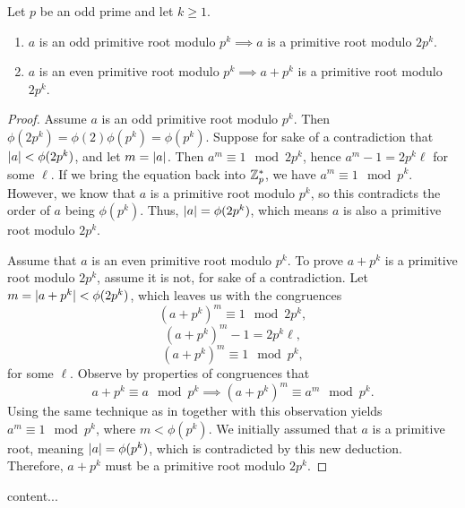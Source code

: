 \documentclass[11pt]{article}
\begin{document}
\begin{exercise}{4}
Let $ p $ be an odd prime and let $ k \geq 1 $.
\begin{enumerate}
	\item $ a $ is an odd primitive root modulo $ p^{k} \implies a $ is a primitive root modulo $ 2p^{k} $.
	\item $ a $ is an even primitive root modulo $ p^{k} \implies a + p^{k}$ is a primitive root modulo $ 2p^{k} $.
\end{enumerate}
\end{exercise}

\begin{proof}
 Assume $ a $ is an odd primitive root modulo $ p^{k} $. Then $ \phi(2p^{k})  = \phi(2) \phi(p^{k}) = \phi(p^{k})$. Suppose for sake of a contradiction that $ |a| < \phi(2 p^{k})$, and let $ m = |a| $. Then $ a^{m} \equiv 1 \mod 2 p^{k} $, hence 
$ a^{m} - 1 = 2 p^{k} \ell $ for some $ \ell $. If we bring the equation back into $ \mathbb{Z}^{*}_{p} $, we have $ a^{m} \equiv 1 \mod p^{k} $. However, we know that $ a $ is a primitive root modulo $ p^{k} $, so this contradicts the order of $ a $ being $ \phi(p^{k}) $. Thus, $ |a| = \phi(2p^{k}) $, which means $ a $ is also a primitive root modulo $ 2p^{k} $.

 Assume that $ a $ is an even primitive root modulo $ p^{k} $. To prove $ a + p^{k}$ is a primitive root modulo $ 2p^{k} $, assume it is not, for sake of a contradiction. Let $m =  |a + p^{k}| < \phi(2p^{k}) $, which leaves us with the congruences
\[ (a +p^{k})^{m} \equiv 1 \mod 2 p^{k}, \]
\[ (a + p^{k})^{m} - 1 = 2 p^{k} \ell, \]
\[ (a + p^{k})^{m} \equiv 1 \mod p^{k}, \]
for some $ \ell $. Observe by properties of congruences that
\[ a + p^{k} \equiv a \mod p^{k} \implies (a + p^{k})^{m} \equiv a^{m} \mod p^{k}. \]
Using the same technique as in  together with this observation yields $ a^{m} \equiv 1 \mod p^{k} $, where $ m < \phi(p^{k}) $. We initially assumed that $ a $ is a primitive root, meaning $ |a| = \phi(p^{k}) $, which is contradicted by this new deduction. Therefore, $ a + p^{k} $ must be a primitive root modulo $ 2p^{k} $.
\end{proof}

\begin{exercise}{5}
content...
\end{exercise}
\end{document}

